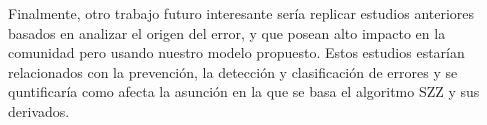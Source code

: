 \documentclass[a4paper, 12pt]{book}
\begin{document}
Finalmente, otro trabajo futuro interesante ser\'ia replicar estudios anteriores basados en analizar el origen del error, y que posean alto impacto en la comunidad pero usando nuestro modelo propuesto. Estos estudios estar\'ian relacionados con la prevenci\'on, la detecci\'on y clasificaci\'on de errores y se quntificar\'ia  como afecta la asunci\'on en la que se basa el algoritmo SZZ y sus derivados.



\cleardoublepage


\end{document}
